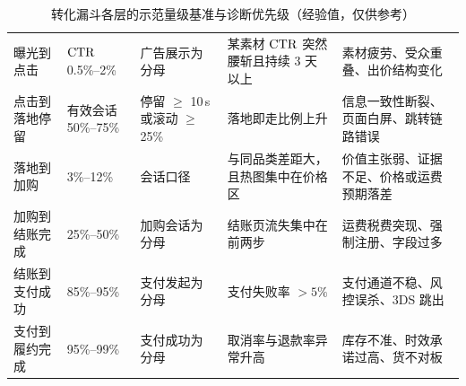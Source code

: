 \begin{table}[htbp]
\centering
\caption{转化漏斗各层的示范量级基准与诊断优先级（经验值，仅供参考）}
\label{tab:funnel-baseline}
\small
\begin{tabularx}{\textwidth}{L{2.0cm} L{1.9cm} L{1.8cm} L{3.4cm} Y}
\toprule
{} &  &  &  &  \\
\midrule
曝光到点击 & $\operatorname{CTR}$ 0.5\%--2\% & 广告展示为分母 & 某素材 $\operatorname{CTR}$ 突然腰斩且持续 3 天以上 & 素材疲劳、受众重叠、出价结构变化 \\
\addlinespace
点击到落地停留 & 有效会话 50\%--75\% & 停留 $\ge$ 10\,s 或滚动 $\ge$ 25\% & 落地即走比例上升 & 信息一致性断裂、页面白屏、跳转链路错误 \\
\addlinespace
落地到加购 & 3\%--12\% & 会话口径 & 与同品类差距大，且热图集中在价格区 & 价值主张弱、证据不足、价格或运费预期落差 \\
\addlinespace
加购到结账完成 & 25\%--50\% & 加购会话为分母 & 结账页流失集中在前两步 & 运费税费突现、强制注册、字段过多 \\
\addlinespace
结账到支付成功 & 85\%--95\% & 支付发起为分母 & 支付失败率 $>5\%$ & 支付通道不稳、风控误杀、3DS 跳出 \\
\addlinespace
支付到履约完成 & 95\%--99\% & 支付成功为分母 & 取消率与退款率异常升高 & 库存不准、时效承诺过高、货不对板 \\
\bottomrule
\end{tabularx}
\end{table}

